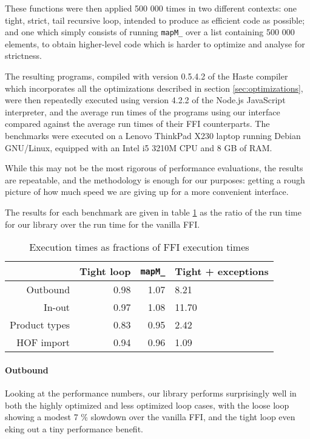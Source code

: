 \documentclass[preprint]{sigplanconf}
\begin{document}
These functions were then applied 500 000 times in two different contexts: one
tight, strict, tail recursive loop, intended to produce as efficient code
as possible; and one which simply consists of running \lstinline!mapM_! over
a list containing 500 000 elements, to obtain higher-level code which is harder to
optimize and analyse for strictness.

The resulting programs, compiled with version 0.5.4.2 of the Haste compiler
which incorporates all the optimizations described in section \ref{sec:optimizations},
were then repeatedly executed using version 4.2.2 of the Node.js JavaScript interpreter,
and the average run times of the programs using our interface compared against
the average run times of their FFI counterparts.
The benchmarks were executed on a Lenovo ThinkPad X230 laptop running Debian GNU/Linux,
equipped with an Intel i5 3210M CPU and 8 GB of RAM.

While this may not be the most rigorous of performance evaluations,
the results are repeatable, and the methodology is enough for our purposes:
getting a rough picture of how much speed we are giving up for a more
convenient interface.

The results for each benchmark are given in table \ref{tbl:performance} as
the ratio of the run time for our library over the run time for the vanilla
FFI.

\begin{table}
  \renewcommand{\arraystretch}{1.5}
  \begin{center}
    \begin{tabular}{|r|r|r|l|}
      \hline
                    & Tight loop & \lstinline!mapM_! & Tight + exceptions\\
      \hline
      Outbound      & 0.98       & 1.07              & 8.21\\
      \hline
      In-out        & 0.97       & 1.08              & 11.70\\
      \hline
      Product types & 0.83       & 0.95              & 2.42\\
      \hline
      HOF import    & 0.94       & 0.96              & 1.09\\
      \hline
    \end{tabular}
  \end{center}
  \caption{Execution times as fractions of FFI execution times}
  \label{tbl:performance}
\end{table}

\paragraph{Outbound}
Looking at the performance numbers, our library performs surprisingly well in
both the highly optimized and less optimized loop cases, with the loose loop
showing a modest 7 \% slowdown over the vanilla FFI, and the tight loop even
eking out a tiny performance benefit.
\end{document}
